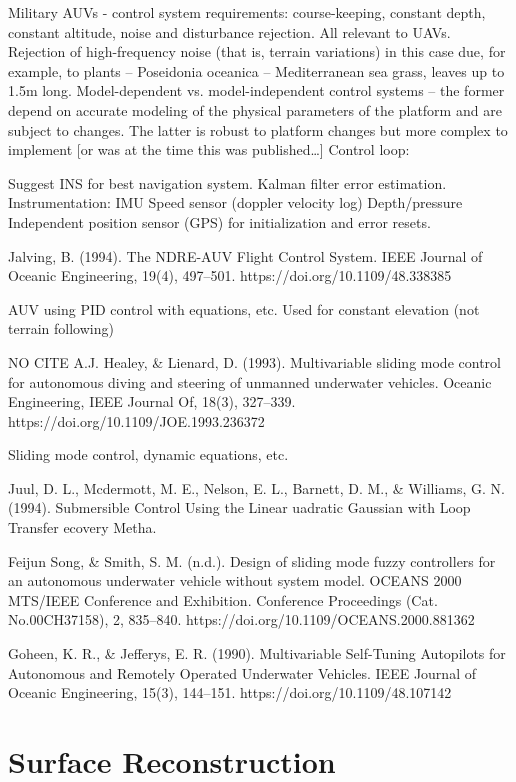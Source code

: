 \documentclass[10pt]{article}
\begin{document}
Military AUVs - control system requirements: course-keeping, constant depth, constant altitude, noise and disturbance rejection. All relevant to UAVs.
Rejection of high-frequency noise (that is, terrain variations) in this case due, for example, to plants -- Poseidonia oceanica -- Mediterranean sea grass, leaves up to 1.5m long.
Model-dependent vs. model-independent control systems -- the former depend on accurate modeling of the physical parameters of the platform and are subject to changes. The latter is robust to platform changes but more complex to implement [or was at the time this was published…]
Control loop:

Suggest INS for best navigation system.
Kalman filter error estimation.
Instrumentation:
IMU
Speed sensor (doppler velocity log)
Depth/pressure
Independent position sensor (GPS) for initialization and error resets.

\cite{Jalving1994}
Jalving, B. (1994). The NDRE-AUV Flight Control System. IEEE Journal of Oceanic Engineering, 19(4), 497–501. https://doi.org/10.1109/48.338385

AUV using PID control with equations, etc.
Used for constant elevation (not terrain following)

NO CITE
A.J. Healey, \& Lienard, D. (1993). Multivariable sliding mode control for autonomous diving and steering of unmanned underwater vehicles. Oceanic Engineering, IEEE Journal Of, 18(3), 327–339. https://doi.org/10.1109/JOE.1993.236372

Sliding mode control, dynamic equations, etc.

\cite{Juul1994}
Juul, D. L., Mcdermott, M. E., Nelson, E. L., Barnett, D. M., \& Williams, G. N. (1994). Submersible Control Using the Linear uadratic Gaussian with Loop Transfer ecovery Metha.

\cite{FeijunSong}
Feijun Song, \& Smith, S. M. (n.d.). Design of sliding mode fuzzy controllers for an autonomous underwater vehicle without system model. OCEANS 2000 MTS/IEEE Conference and Exhibition. Conference Proceedings (Cat. No.00CH37158), 2, 835–840. https://doi.org/10.1109/OCEANS.2000.881362

\cite{Goheen1990}
Goheen, K. R., \& Jefferys, E. R. (1990). Multivariable Self-Tuning Autopilots for Autonomous and Remotely Operated Underwater Vehicles. IEEE Journal of Oceanic Engineering, 15(3), 144–151. https://doi.org/10.1109/48.107142

\section{Surface Reconstruction}
\end{document}
